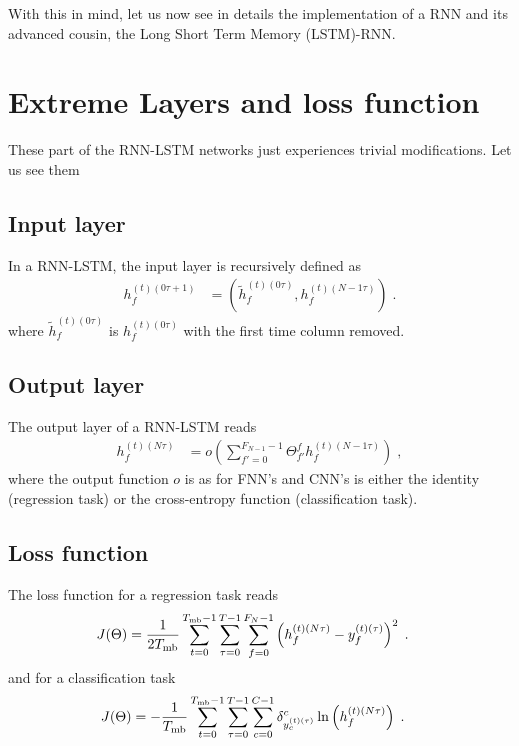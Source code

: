 With this in mind, let us now see in details the implementation of a RNN and its advanced cousin, the Long Short Term Memory (LSTM)-RNN.

\section{Extreme Layers and loss function}

These part of the RNN-LSTM networks just experiences trivial modifications. Let us see them

\subsection{Input layer}

In a RNN-LSTM, the input layer is recursively defined as
\begin{align}
h^{(t)(0\tau+1)}_{f}&=\left(\tilde{h}^{(t)(0\tau)}_{f},h^{(t)(N-1\tau)}_{f}\right)\;.
\end{align}
where $\tilde{h}^{(t)(0\tau)}_{f}$ is $h^{(t)(0\tau)}_{f}$ with the first time column removed.

\subsection{Output layer }

The output layer of a RNN-LSTM reads
\begin{align}
h^{(t)(N\tau)}_{f}&=o\left(\sum_{f'=0}^{F_{N-1}-1}\Theta^f_{f'} h^{(t)(N-1\tau)}_{f}\right)\;,
\end{align}
where the output function $o$ is as for FNN's and CNN's is either the identity (regression task) or the cross-entropy function (classification task).

\subsection{Loss function}

The loss function for a regression task reads
\begin{align}
J(\Theta)&=\frac{1}{2T_{{\rm mb}}}\sum_{t=0}^{T_{{\rm mb}}-1}\sum_{\tau=0}^{T-1}\sum_{f=0}^{F_N-1}
%
\left(h^{(t)( N\tau)}_f-y^{(t)(\tau)}_f\right)^2\;.
\end{align}
and for a classification task
\begin{align}
J(\Theta)&=-\frac{1}{T_{{\rm mb}}}\sum_{t=0}^{T_{{\rm mb}}-1}\sum_{\tau=0}^{T-1}\sum_{c=0}^{C-1}
%
\delta^{c}_{y^{(t)(\tau)}_c} \ln \left(h^{(t)( N\tau)}_f\right)\;.
\end{align}


